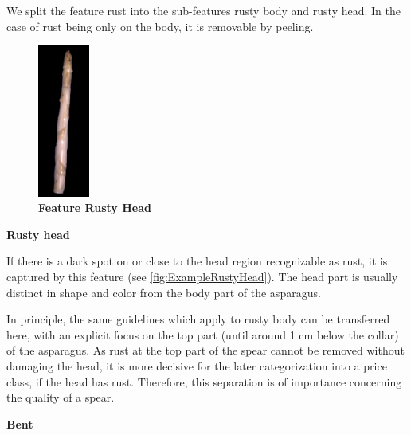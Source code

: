 We split the feature rust into the sub-features rusty body and rusty head. In the case of rust being only on the body, it is removable by peeling.

\vspace{5cm}

\begin{figure}
  \vspace{-30pt}
  \begin{center}
    \includegraphics[width=0.15\textwidth]{Figures/chapter03/example_img_rustyhead.png}
  \end{center}
  \vspace{-15pt}
  \caption[Example Image Feature Rusty Head]{ \textbf{Feature Rusty Head}}
  \vspace{-10pt}
  \label{fig:ExampleRustyHead}
\end{figure}

\textbf{Rusty head}

If there is a dark spot on or close to the head region recognizable as rust, it is captured by this feature (see \autoref{fig:ExampleRustyHead}). The head part is usually distinct in shape and color from the body part of the asparagus.

In principle, the same guidelines which apply to rusty body can be transferred here, with an explicit focus on the top part (until around 1 cm below the collar) of the asparagus. As rust at the top part of the spear cannot be removed without damaging the head, it is more decisive for the later categorization into a price class, if the head has rust. Therefore, this separation is of importance concerning the quality of a spear.

\bigskip
\textbf{Bent}

